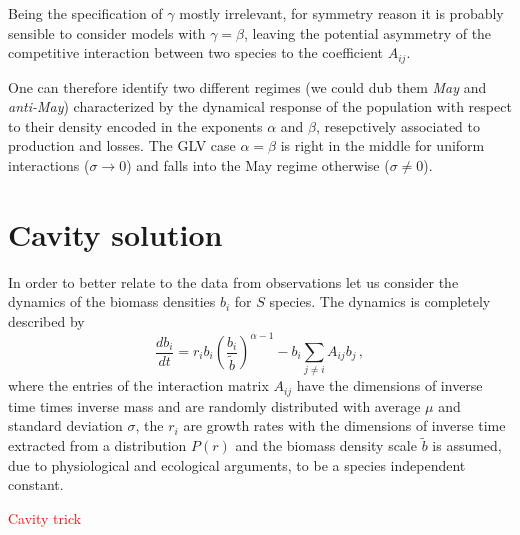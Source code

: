 \documentclass[10pt]{article}
\begin{document}
Being the specification of $\gamma$ 
mostly irrelevant, for symmetry reason it is probably sensible to consider 
models with $\gamma=\beta$,
leaving the potential asymmetry of the competitive interaction between two species
to the coefficient $A_{ij}$.

One can therefore identify two different regimes (we could dub them \textit{May} and \textit{anti-May})
characterized by the dynamical response of the population with respect to their density
encoded in the exponents $\alpha$ and $\beta$, resepctively associated
to production and losses. The GLV case $\alpha=\beta$ is right in the middle for uniform
interactions ($\sigma\to0$) and falls into the May regime otherwise ($\sigma\neq0$). 

\section{Cavity solution}
In order to better relate to the data from observations let us consider
the dynamics of the biomass densities $b_i$ for $S$ species.
The dynamics is completely described by
\begin{equation}
    \frac{d b_i}{dt} = r_ib_i\left(\frac{b_i}{\tilde{b}}\right)^{\alpha -1} - b_i\sum_{j\neq i}A_{ij}b_j \, ,
    \label{eq: full system}
\end{equation}
where the entries of the interaction matrix $A_{ij}$ have the dimensions of inverse time times inverse
mass and are randomly distributed with average $\mu$ and standard deviation $\sigma$,
the $r_i$ are growth rates with the dimensions of inverse time extracted from a distribution
$P(r)$ and the biomass density scale
$\tilde{b}$ is assumed, due to physiological and ecological arguments,
to be a species independent constant.

\textcolor{red}{Cavity trick}
\end{document}
